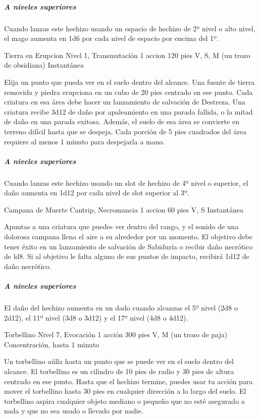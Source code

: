 \documentclass[a4paper,twocolumn,openany,10pt]{dndbook}
\begin{document}
	\subparagraph{A niveles superiores} Cuando lanzas este hechizo usando un espacio de hechizo de 2º nivel o alto nivel, el
	mago aumenta en 1d6 por cada nivel de espacio por encima del 1º. 

\spellheader%
	{Tierra en Erupcion}
	{Nivel 1, Transmutación}
	{1 accion}
	{120 pies}
	{V, S, M (un trozo de obsidiana)}
	{Instantánea}
	
	Elija un punto que pueda ver en el suelo dentro del alcance. Una fuente de tierra removida y piedra erupciona en un cubo de 
	20 pies centrado en ese punto. Cada criatura en esa área debe hacer un lanzamiento de salvación de Destreza. Una criatura
	recibe 3d12 de daño por apaleamiento en una parada fallida, o la mitad de daño en una parada exitosa. Además, el suelo de
	esa área se convierte en terreno difícil hasta que se despeja. Cada porción de 5 pies cuadrados del área requiere al menos 1
	minuto para despejarla a mano.

	\subparagraph{A niveles superiores} Cuando lanzas este hechizo usando un slot de hechizo de 4º nivel o superior, el daño
	aumenta en 1d12 por cada nivel de slot superior al 3º. 

\spellheader%
	{Campana de Muerte}
	{Cantrip, Necromancia}
	{1 accion}
	{60 pies}
	{V, S}
	{Instantánea}
	
	Apuntas a una criatura que puedes ver dentro del rango, y el sonido de una dolorosa campana llena el aire a su alrededor por
	un momento. El objetivo debe tener éxito en un lanzamiento de salvación de Sabiduría o recibir daño necrótico de ld8. Si al
	objetivo le falta alguno de sus puntos de impacto, recibirá 1d12 de daño necrótico.

	\subparagraph{A niveles superiores} El daño del hechizo aumenta en un dado cuando alcanzas el 5º nivel (2d8 o 2d12), el 11º
	nivel (3d8 o 3d12) y el 17º nivel (4d8 o 4d12). 

\spellheader%
	{Torbellino}
	{Nivel 7, Evocación}
	{1 acción}
	{300 pies}
	{V, M (un trozo de paja)}
	{Concentración, hasta 1 minuto}
	
	Un torbellino aúlla hasta un punto que se puede ver en el suelo dentro del alcance. El torbellino es un cilindro de 10 pies
	de radio y 30 pies de altura centrado en ese punto. Hasta que el hechizo termine, puedes usar tu acción para mover el
	torbellino hasta 30 pies en cualquier dirección a lo largo del suelo. El torbellino aspira cualquier objeto mediano o
	pequeño que no esté asegurado a nada y que no sea usado o llevado por nadie.
	
\end{document}
